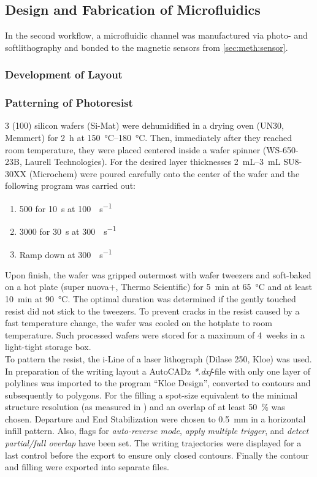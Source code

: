 \subsection{Design and Fabrication of Microfluidics}
In the second workflow, a microfluidic channel was manufactured via photo- and softlithography and bonded to the magnetic sensors from \ref{sec:meth:sensor}.
\subsubsection{Development of Layout}

\subsubsection{Patterning of Photoresist}
\SI{3}{\inch} (100) silicon wafers (Si-Mat) were dehumidified in a drying oven (UN30, Memmert) for \SI{2}{\hour} at \SIrange{150}{180}{\degreeCelsius}. Then, immediately after they reached room temperature, they were placed centered inside a wafer spinner (WS-650-23B, Laurell Technologies). For the desired layer thicknesses \SIrange{2}{3}{\milli\liter} SU8-30XX (Microchem) were poured carefully onto the center of the wafer and the following program was carried out:
\begin{enumerate}[noitemsep]
\item \SI{500}{\rpm} for \SI{10}{s} at \SI{100}{\rpm\per\second}
\item \SI{3000}{\rpm} for \SI{30}{s} at \SI{300}{\rpm\per\second}
\item Ramp down at \SI{300}{\rpm\per\second}
\end{enumerate}
Upon finish, the wafer was gripped outermost with wafer tweezers and soft-baked on a hot plate (super nuova+, Thermo Scientific) for \SI{5}{\minute} at \SI{65}{\degreeCelsius} and at least \SI{10}{\minute} at \SI{90}{\degreeCelsius}. The optimal duration was determined if the gently touched resist did not stick to the tweezers. To prevent cracks in the resist caused by a fast temperature change, the wafer was cooled on the hotplate to room temperature. Such processed wafers were stored for a maximum of \SI{4}{weeks} in a light-tight storage box.\\
To pattern the resist, the i-Line of a laser lithograph (Dilase 250, Kloe) was used. In preparation of the writing layout a AutoCADz \textit{*.dxf}-file with only one layer of polylines was imported to the program ``Kloe Design'', converted to contours and subsequently to polygons. For the filling a spot-size equivalent to the minimal structure resolution (as measured in \citet{lit:tech:rojda2020}) and an overlap of at least \SI{50}{\percent} was chosen. Departure and End Stabilization were chosen to \SI{.5}{\milli\meter} in a horizontal infill pattern. Also, flags for \textit{auto-reverse mode}, \textit{apply multiple trigger}, and \textit{detect partial/full overlap} have been set.  The writing trajectories were displayed for a last control before the export to ensure only closed contours. Finally the contour and filling were exported into separate files.\\
